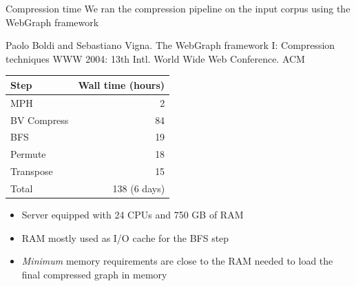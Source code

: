 \documentclass[aspectratio=169,xcolor=table]{beamer}
\begin{document}
    \begin{frame}{Compression time}
        We ran the compression pipeline on the input corpus using the WebGraph
        framework
        \begin{thebibliography}{}
            \footnotesize
             Paolo Boldi and Sebastiano Vigna.
            \newblock The WebGraph framework I: Compression techniques
            \newblock WWW 2004: 13th Intl. World Wide Web Conference. ACM
        \end{thebibliography}

        \begin{center}
            \begin{tabular}{lr}
                \alert{Step} & \alert{Wall time} (hours)\\
                \hline
                MPH & 2\\
                BV Compress & 84\\
                BFS & 19\\
                Permute & 18\\
                Transpose & 15\\
                \hline
                Total & 138 (6 days)\\
            \end{tabular}
        \end{center}

        \begin{itemize}
            \item Server equipped with 24 CPUs and 750 GB of RAM
            \item RAM mostly used as I/O cache for the BFS step
            \item \emph{Minimum} memory requirements are close to the RAM needed to load the
                final compressed graph in memory
        \end{itemize}
    \end{frame}
\end{document}

